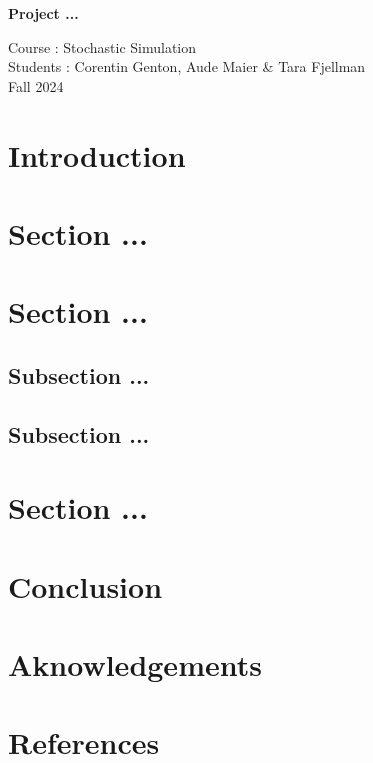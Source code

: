 \documentclass[a4paper, 12pt,oneside]{article}
\begin{document}
 
	\begin{center}
	    \Large
	    \textbf{Project ...} 
	    \vspace{0.4cm}
	    \large

		Course : Stochastic Simulation \\
	    Students : Corentin Genton, Aude Maier \& Tara Fjellman \\
	    \small{Fall 2024}
	\end{center}

	\section{Introduction}
	\section{Section ...}
	\section{Section ...}
        \subsection{Subsection ...}
        \subsection{Subsection ...}
	\section{Section ...}
	\section{Conclusion}
	\section*{Aknowledgements}
	\section*{References}
\end{document}
